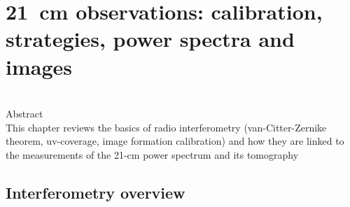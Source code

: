 \chapter{21~cm observations: calibration, strategies, power spectra and images}

\begin{bf}
  \author{Gianni Bernardi (INAF-IRA \& Rhodes University)}\\
  
Abstract\\

This chapter reviews the basics of radio interferometry (van-Citter-Zernike theorem, uv-coverage, image formation calibration) and how they are linked to the measurements of the 21-cm power spectrum and its tomography 
\end{bf}



\section{Interferometry overview}

